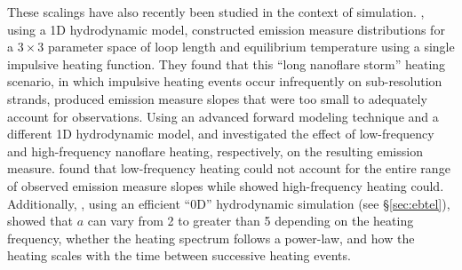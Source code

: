 \par These scalings have also recently been studied in the context of simulation. \citet{mulu-moore_can_2011}, using a 1D hydrodynamic model, constructed emission measure distributions for a $3\times3$ parameter space of loop length and equilibrium temperature using a single impulsive heating function. They found that this ``long nanoflare storm'' heating scenario, in which impulsive heating events occur infrequently on sub-resolution strands, produced emission measure slopes that were too small to adequately account for observations. Using an advanced forward modeling technique and a different 1D hydrodynamic model, \citet{bradshaw_diagnosing_2012} and \citet{reep_diagnosing_2013} investigated the effect of low-frequency and high-frequency nanoflare heating, respectively, on the resulting emission measure. \citet{bradshaw_diagnosing_2012} found that low-frequency heating could not account for the entire range of observed emission measure slopes while \citet{reep_diagnosing_2013} showed high-frequency heating could. Additionally, \citet{cargill_active_2014}, using an efficient ``0D'' hydrodynamic simulation (see \S\ref{sec:ebtel}), showed that $a$ can vary from 2 to greater than 5 depending on the heating frequency, whether the heating spectrum follows a power-law, and how the heating scales with the time between successive heating events.
%
